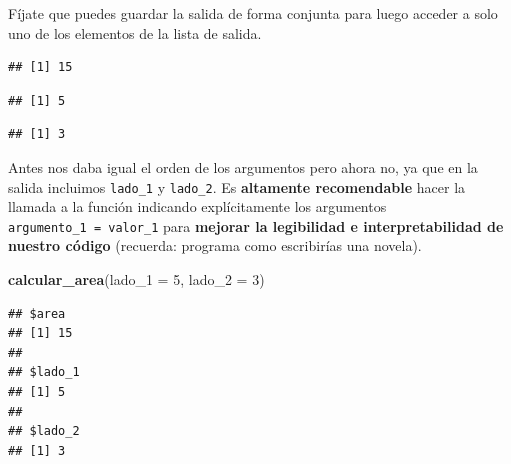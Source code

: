 \documentclass[11pt,]{book}
\newenvironment{Shaded}{\begin{snugshade}}{\end{snugshade}}
\newcommand{\DataTypeTok}[1]{\textcolor[rgb]{0.27,0.27,0.27}{#1}}
\newcommand{\DecValTok}[1]{\textcolor[rgb]{0.06,0.06,0.06}{#1}}
\newcommand{\KeywordTok}[1]{\textcolor[rgb]{0.27,0.27,0.27}{\textbf{#1}}}
\newcommand{\NormalTok}[1]{#1}
\newcommand{\OperatorTok}[1]{\textcolor[rgb]{0.43,0.43,0.43}{\textbf{#1}}}
\newcommand{\StringTok}[1]{\textcolor[rgb]{0.5,0.5,0.5}{#1}}
\begin{document}
Fíjate que puedes guardar la salida de forma conjunta para luego acceder a solo uno de los elementos de la lista de salida.

\begin{Shaded}
\end{Shaded}

\begin{verbatim}
## [1] 15
\end{verbatim}

\begin{Shaded}
\end{Shaded}

\begin{verbatim}
## [1] 5
\end{verbatim}

\begin{Shaded}
\end{Shaded}

\begin{verbatim}
## [1] 3
\end{verbatim}

Antes nos daba igual el orden de los argumentos pero ahora no, ya que en la salida incluimos \texttt{lado\_1} y \texttt{lado\_2}. Es \textbf{altamente recomendable} hacer la llamada a la función indicando explícitamente los argumentos \texttt{argumento\_1\ =\ valor\_1} para \textbf{mejorar la legibilidad e interpretabilidad de nuestro código} (recuerda: programa como escribirías una novela).

\begin{Shaded}
\begin{Highlighting}[]
\KeywordTok{calcular_area}\NormalTok{(}\DataTypeTok{lado_1 =} \DecValTok{5}\NormalTok{, }\DataTypeTok{lado_2 =} \DecValTok{3}\NormalTok{)}
\end{Highlighting}
\end{Shaded}

\begin{verbatim}
## $area
## [1] 15
## 
## $lado_1
## [1] 5
## 
## $lado_2
## [1] 3
\end{verbatim}
\end{document}
